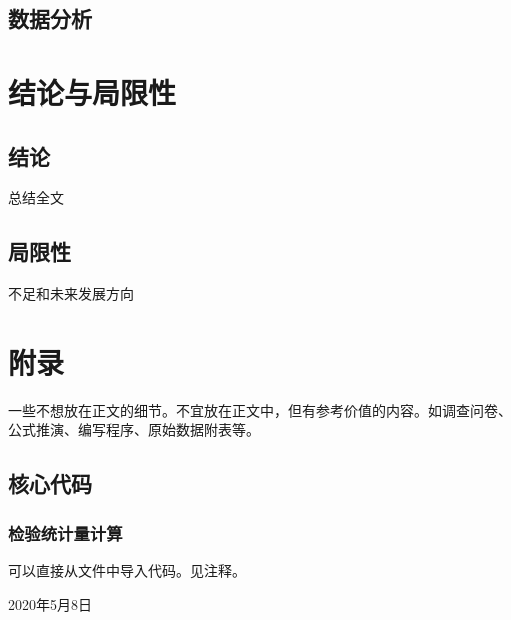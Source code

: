 \documentclass{SUFEThesis}
\begin{document}
\subsection{数据分析}


\section{结论与局限性}
\subsection{结论}
总结全文
\subsection{局限性}
不足和未来发展方向

\newpage



\section{附录}
一些不想放在正文的细节。不宜放在正文中，但有参考价值的内容。如调查问卷、 公式推演、编写程序、原始数据附表等。
\subsection{核心代码}
\subsubsection{检验统计量计算}
可以直接从文件中导入代码。见注释。
% 


\statement %
\hfill 2020年5月8日 %
\end{document}

